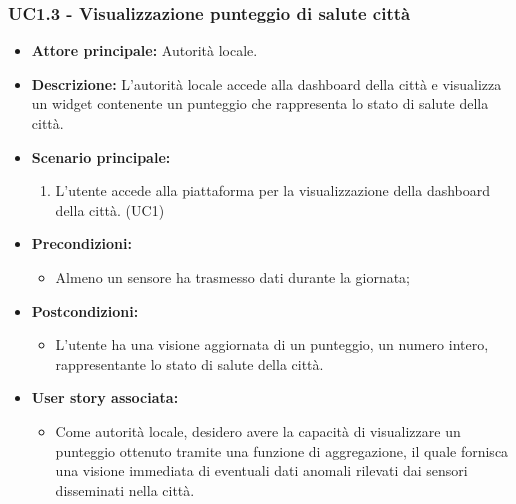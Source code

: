 \subsubsection{UC1.3 - Visualizzazione punteggio di salute città}
\begin{itemize}
    \item \textbf{Attore principale:} Autorità locale.
    \item \textbf{Descrizione:} L'autorità locale accede alla dashboard della città e visualizza un widget contenente un punteggio che rappresenta lo stato di salute della città.
    \item \textbf{Scenario principale:}
          \begin{enumerate}
            \item L'utente accede alla piattaforma per la visualizzazione della dashboard della città. (UC1)
        \end{enumerate}
    \item \textbf{Precondizioni:}
          \begin{itemize}
              \item Almeno un sensore ha trasmesso dati durante la giornata;
          \end{itemize}
    \item \textbf{Postcondizioni:}
          \begin{itemize}
              \item      L'utente ha una visione aggiornata di un punteggio, un numero intero, rappresentante lo stato di salute della città.
          \end{itemize}
    \item \textbf{User story associata:}
          \begin{itemize}
              \item Come autorità locale, desidero avere la capacità di visualizzare un punteggio ottenuto tramite una funzione di aggregazione, il quale fornisca una visione immediata di eventuali dati anomali rilevati dai sensori disseminati nella città.
          \end{itemize}
\end{itemize}
